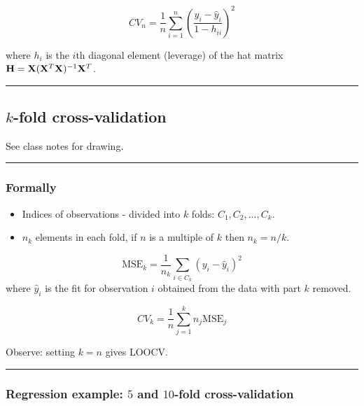 \documentclass[]{article}
\providecommand{\tightlist}{%
  \setlength{\itemsep}{0pt}\setlength{\parskip}{0pt}}
\begin{document}
\[ CV_{n}=\frac{1}{n}\sum_{i=1}^n \left( \frac{y_i-\hat{y}_i}{1-h_{ii}} \right) ^2\]

where \(h_i\) is the \(i\)th diagonal element (leverage) of the hat
matrix \({\bf H}={\bf X}({\bf X}^T{\bf X})^{-1}{\bf X}^T\).

\begin{center}\rule{0.5\linewidth}{\linethickness}\end{center}

\hypertarget{k-fold-cross-validation}{%
\subsection{\texorpdfstring{\(k\)-fold
cross-validation}{k-fold cross-validation}}\label{k-fold-cross-validation}}

See class notes for drawing.

\begin{center}\rule{0.5\linewidth}{\linethickness}\end{center}

\hypertarget{formally}{%
\subsubsection{Formally}\label{formally}}

\begin{itemize}
\tightlist
\item
  Indices of observations - divided into \(k\) folds:
  \(C_1, C_2, \ldots, C_k\).
\item
  \(n_k\) elements in each fold, if \(n\) is a multiple of \(k\) then
  \(n_k=n/k\).
\end{itemize}

\[\text{MSE}_k=\frac{1}{n_k}\sum_{i\in C_k}(y_i-\hat{y}_i)^2\] where
\(\hat{y}_i\) is the fit for observation \(i\) obtained from the data
with part \(k\) removed.

\[CV_{k}=\frac{1}{n} \sum_{j=1}^k n_j \text{MSE}_j\]

Observe: setting \(k=n\) gives LOOCV.

\begin{center}\rule{0.5\linewidth}{\linethickness}\end{center}

\hypertarget{regression-example-5-and-10-fold-cross-validation}{%
\subsubsection{\texorpdfstring{Regression example: \(5\) and \(10\)-fold
cross-validation}{Regression example: 5 and 10-fold cross-validation}}\label{regression-example-5-and-10-fold-cross-validation}}
\end{document}
